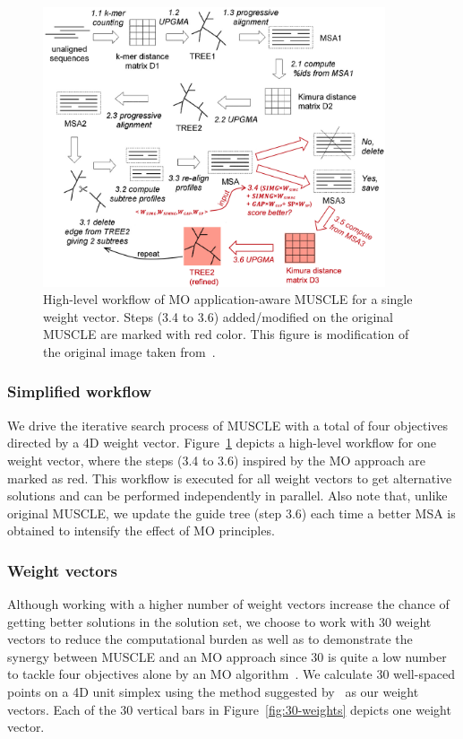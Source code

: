 \begin{figure}[!htbp]
	\centering
	\includegraphics[width=0.9\textwidth]{Figure/ma-muscle}
	\caption[High-level workflow of MO application-aware MUSCLE for a single weight vector.]{High-level workflow of MO application-aware MUSCLE for a single weight vector. Steps (3.4 to 3.6) added/modified on the original MUSCLE are marked with red color. This figure is modification of the original image taken from~\cite{edgar2004muscle}.}
	\label{fig:ma-muscle}
\end{figure}

\subsubsection{Simplified workflow}
We drive the iterative search process of MUSCLE with a total of four objectives directed by a 4D weight vector. Figure~\ref{fig:ma-muscle} depicts a high-level workflow for one weight vector, where the steps (3.4 to 3.6) inspired by the MO approach are marked as red. This workflow is executed for all weight vectors to get alternative solutions and can be performed independently in parallel. %
Also note that, unlike original MUSCLE, we update the guide tree (step 3.6) each time a better MSA is obtained to intensify the effect of MO principles.

\subsubsection{Weight vectors}
Although working with a higher number of weight vectors increase the chance of getting better solutions in the solution set, we choose to work with 30 weight vectors to reduce the computational burden as well as to demonstrate the synergy between MUSCLE and an MO approach since 30 is quite a low number to tackle four objectives alone by an MO algorithm~\cite{deb2014evolutionary}. We calculate 30 well-spaced points on a 4D unit simplex using the method suggested by~\cite{ref_dirs_energy} as our weight vectors. Each of the 30 vertical bars in Figure~\ref{fig:30-weights} depicts one weight vector. %


